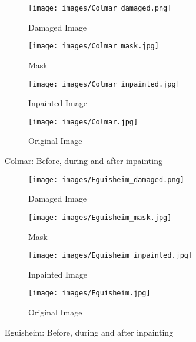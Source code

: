 \begin{figure}[htbp]
    \centering 
    \begin{minipage}{0.8\textwidth} 
        \centering 
        
        \begin{subfigure}[b]{0.45\linewidth} 
            \texttt{[image: images/Colmar\_damaged.png]}
            \caption{Damaged Image}
        \end{subfigure}
        \hfill
        \begin{subfigure}[b]{0.45\linewidth}
            \texttt{[image: images/Colmar\_mask.jpg]}
            \caption{Mask}
        \end{subfigure}

        \vspace{0.5cm}
        \begin{subfigure}[b]{0.45\linewidth}
            \texttt{[image: images/Colmar\_inpainted.jpg]}
            \caption{Inpainted Image}
        \end{subfigure}
        \hfill
        \begin{subfigure}[b]{0.45\linewidth}
            \texttt{[image: images/Colmar.jpg]}
            \caption{Original Image}
        \end{subfigure}

        \caption{Colmar: Before, during and after inpainting}
        \label{fig:Colmar}
    \end{minipage}
\end{figure}

\begin{figure}[htbp]
    \centering 
    \begin{minipage}{0.8\textwidth} 
        \centering 
        
        \begin{subfigure}[b]{0.45\linewidth} 
            \texttt{[image: images/Eguisheim\_damaged.png]}
            \caption{Damaged Image}
        \end{subfigure}
        \hfill
        \begin{subfigure}[b]{0.45\linewidth}
            \texttt{[image: images/Eguisheim\_mask.jpg]}
            \caption{Mask}
        \end{subfigure}

        \vspace{0.5cm}
        \begin{subfigure}[b]{0.45\linewidth}
            \texttt{[image: images/Eguisheim\_inpainted.jpg]}
            \caption{Inpainted Image}
        \end{subfigure}
        \hfill
        \begin{subfigure}[b]{0.45\linewidth}
            \texttt{[image: images/Eguisheim.jpg]}
            \caption{Original Image}
        \end{subfigure}

        \caption{Eguisheim: Before, during and after inpainting}
        \label{fig:Eguisheim}
    \end{minipage}
\end{figure}

